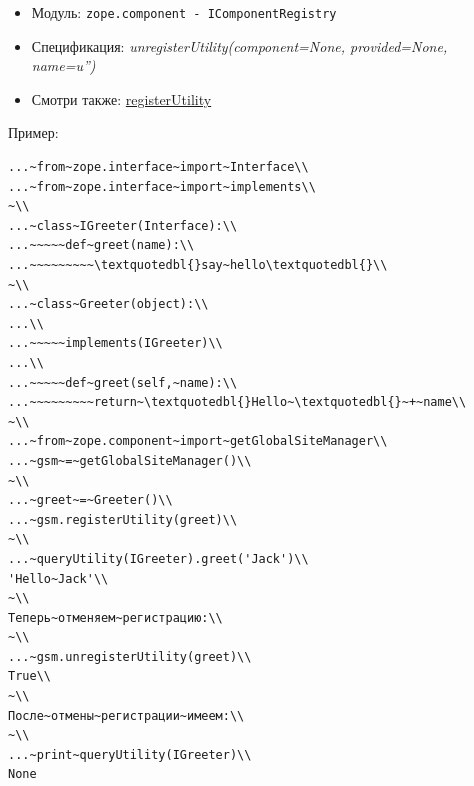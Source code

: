 \documentclass[a4paper,openany,twoside,draft]{book}
\providecommand*{\DUroletitlereference}[1]{\textsl{#1}}
\begin{document}
\begin{itemize}

\item Модуль: \texttt{zope.component - IComponentRegistry}

\item Спецификация: \DUroletitlereference{unregisterUtility(component=None, provided=None,
name=u'')}

\item Смотри также: \hyperref[registerutility]{registerUtility}

\end{itemize}

Пример:

\begin{verbatim}
...~from~zope.interface~import~Interface\\
...~from~zope.interface~import~implements\\
~\\
...~class~IGreeter(Interface):\\
...~~~~~def~greet(name):\\
...~~~~~~~~~\textquotedbl{}say~hello\textquotedbl{}\\
~\\
...~class~Greeter(object):\\
...\\
...~~~~~implements(IGreeter)\\
...\\
...~~~~~def~greet(self,~name):\\
...~~~~~~~~~return~\textquotedbl{}Hello~\textquotedbl{}~+~name\\
~\\
...~from~zope.component~import~getGlobalSiteManager\\
...~gsm~=~getGlobalSiteManager()\\
~\\
...~greet~=~Greeter()\\
...~gsm.registerUtility(greet)\\
~\\
...~queryUtility(IGreeter).greet('Jack')\\
'Hello~Jack'\\
~\\
Теперь~отменяем~регистрацию:\\
~\\
...~gsm.unregisterUtility(greet)\\
True\\
~\\
После~отмены~регистрации~имеем:\\
~\\
...~print~queryUtility(IGreeter)\\
None
\end{verbatim}
\end{document}
